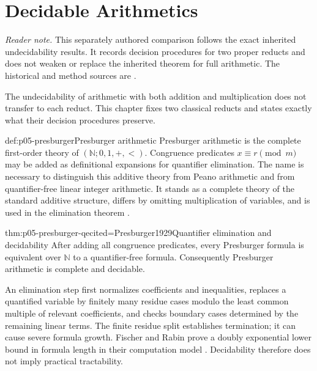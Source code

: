 \chapter{Decidable Arithmetics}\label{sec:p05-decidable-arithmetics}

\noindent\textit{Reader note.}  This separately authored comparison follows
the exact inherited undecidability results.  It records decision procedures
for two proper reducts and does not weaken or replace the inherited theorem for
full arithmetic.  The historical and method sources are
\cite{Presburger1929,Skolem1930Arithmetic,FefermanVaught1959}.

The undecidability of arithmetic with both addition and multiplication does not
transfer to each reduct. This chapter fixes two classical reducts and states
exactly what their decision procedures preserve.

\begin{hbdefinition}{def:p05-presburger}{Presburger arithmetic}
Presburger arithmetic is the complete first-order theory of
\((\mathbb N;0,1,+,<)\). Congruence predicates
\(x\equiv r\pmod m\) may be added as definitional expansions for quantifier
elimination. The name is necessary to distinguish this additive theory from
Peano arithmetic and from quantifier-free linear integer arithmetic. It stands
as a complete theory of the standard additive structure, differs by omitting
multiplication of variables, and is used in the elimination theorem
\cite{Presburger1929}.
\end{hbdefinition}

\begin{hbtheorem}{thm:p05-presburger-qe}{cited=Presburger1929}{Quantifier elimination and decidability}
After adding all congruence predicates, every Presburger formula is equivalent
over \(\mathbb N\) to a quantifier-free formula. Consequently Presburger
arithmetic is complete and decidable.
\end{hbtheorem}

An elimination step first normalizes coefficients and inequalities, replaces a
quantified variable by finitely many residue cases modulo the least common
multiple of relevant coefficients, and checks boundary cases determined by
the remaining linear terms. The finite residue split establishes termination;
it can cause severe formula growth. Fischer and Rabin prove a doubly
exponential lower bound in formula length in their computation model
\cite{FischerRabin1974}. Decidability therefore does not imply practical
tractability.

